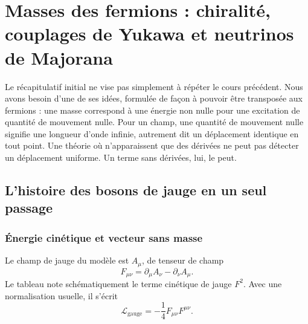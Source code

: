 \chapter{Masses des fermions : chiralité, couplages de Yukawa et neutrinos de Majorana}


Le récapitulatif initial ne vise pas simplement à répéter le cours précédent. Nous avons besoin d’une de ses idées, formulée de façon à pouvoir être transposée aux fermions : une masse correspond à une énergie non nulle pour une excitation de quantité de mouvement nulle. Pour un champ, une quantité de mouvement nulle signifie une longueur d’onde infinie, autrement dit un déplacement identique en tout point. Une théorie où n’apparaissent que des dérivées ne peut pas détecter un déplacement uniforme. Un terme sans dérivées, lui, le peut.

\section{L’histoire des bosons de jauge en un seul passage}

\subsection{Énergie cinétique et vecteur sans masse}

Le champ de jauge du modèle est \(A_\mu\), de tenseur de champ \begin{equation}
  F_{\mu\nu}
  =\partial_\mu A_\nu-\partial_\nu A_\mu .
  \label{eq:l09-field-strength}
\end{equation}Le tableau note schématiquement le terme cinétique de jauge \(F^2\). Avec une normalisation usuelle, il s’écrit \begin{equation}
  \mathcal L_{\mathrm{gauge}}
  =-\frac14 F_{\mu\nu}F^{\mu\nu}.
  \label{eq:l09-gauge-kinetic}
\end{equation}

